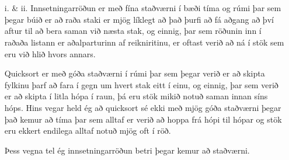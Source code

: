 \documentclass{article}
\begin{document}
	\section{}
	\begin{itemize}
		\item[i. \& ii.] 
			Innsetningarröðun er með fína staðværni í bæði 
			tíma og rúmi þar sem þegar búið er að raða staki er mjög líklegt 
			að það þurfi að fá aðgang að því aftur til að bera saman við 
			næsta stak, og einnig, þar sem röðunin inn í raðaða listann 
			er aðalparturinn af reikniritinu, er oftast verið að ná í 
			stök sem eru við hlið hvors annars.

			Quicksort er með góða staðværni í rúmi þar sem þegar verið er 
			að skipta fylkinu þarf að fara í gegn um hvert stak eitt í einu, 
			og einnig, þar sem verið er að skipta í litla hópa í raun, 
			þá eru stök mikið notuð saman innan síns hóps. Hins vegar held 
			ég að quicksort sé ekki með mjög góða staðværni þegar það kemur 
			að tíma þar sem alltaf er verið að hoppa frá hópi til hópar 
			og stök eru ekkert endilega alltaf notuð mjög oft í röð.

			Þess vegna tel ég innsetningarröðun betri þegar kemur að 
			staðværni.
	\end{itemize}

	\newpage
\end{document}
